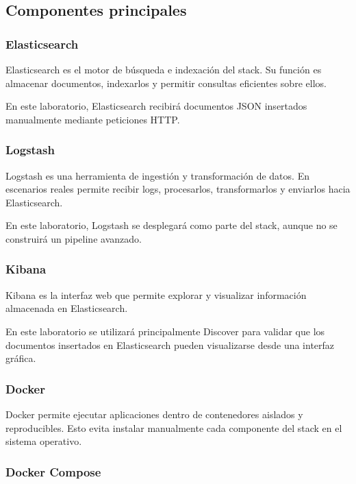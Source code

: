 \documentclass[
  coursetitle={Cómputo Nube y Tecnologías Emergentes},
  coursehours={96},
  coursedate={Verano 2026},
  doctype={Laboratorio},
  otherlangs={english,french},
  authorname={Lázaro},
  authorsurname={Bustio-Martínez},
  authortitle={PhD},
  role={Profesor Investigador},
  email={lbustio@inaoe.mx},
  phone={5559504000},
  ext={7459},
  institution={Instituto Nacional de Astrofísica, Óptica y Electrónica (INAOE)},
  department={Maestría en Ciencias en Tecnologías de Seguridad},
  address={Luis Enrique Erro 1, Sta. Ma. Tonantzintla, San Andrés Cholula, CP 72840, Puebla, México},
  margin={0.5in}
]{../../lbustio_lecture_notes}
\begin{document}
\subsection{Componentes principales}

\subsubsection{Elasticsearch}

Elasticsearch es el motor de búsqueda e indexación del stack. Su función es almacenar documentos, indexarlos y permitir consultas eficientes sobre ellos.

En este laboratorio, Elasticsearch recibirá documentos JSON insertados manualmente mediante peticiones HTTP.

\subsubsection{Logstash}

Logstash es una herramienta de ingestión y transformación de datos. En escenarios reales permite recibir logs, procesarlos, transformarlos y enviarlos hacia Elasticsearch.

En este laboratorio, Logstash se desplegará como parte del stack, aunque no se construirá un pipeline avanzado.

\subsubsection{Kibana}

Kibana es la interfaz web que permite explorar y visualizar información almacenada en Elasticsearch.

En este laboratorio se utilizará principalmente Discover para validar que los documentos insertados en Elasticsearch pueden visualizarse desde una interfaz gráfica.

\subsubsection{Docker}

Docker permite ejecutar aplicaciones dentro de contenedores aislados y reproducibles. Esto evita instalar manualmente cada componente del stack en el sistema operativo.

\subsubsection{Docker Compose}
\end{document}
